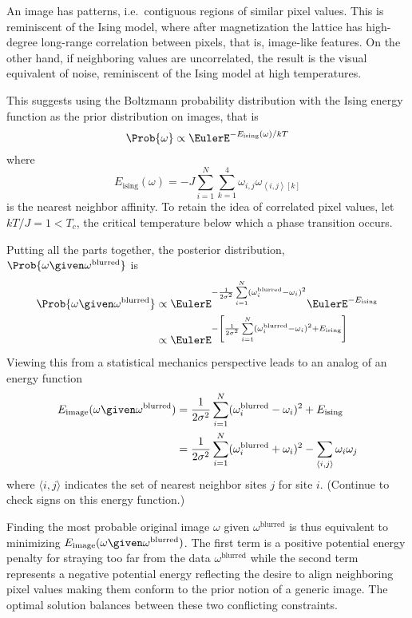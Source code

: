 \documentclass[12pt]{article}
\begin{document}
An image has patterns, i.e.\ contiguous regions of similar pixel values.
This is reminiscent of the Ising model, where after magnetization the
lattice has high-degree long-range correlation between pixels, that is,
image-like features.  On the other hand, if neighboring values are
uncorrelated, the result is the visual equivalent of noise, reminiscent
of the Ising model at high temperatures.

This suggests using the Boltzmann probability distribution with the
Ising energy function as the prior distribution on images, that is
\[
    \Prob{\omega} \propto \EulerE^{-E_{\text{ising}}(\omega)/kT}
\] where
\[
    E_{\text{ising}}(\omega) = -J \sum\limits_{i=1}^{N} \sum\limits_{k=1}^4
    \omega_{i, j} \omega_{\left\langle i,j \right\rangle[k]}
\] is the nearest neighbor affinity. To retain the idea of correlated
pixel values, let \( kT/J = 1 < T_c \), the critical temperature below
which a phase transition occurs.

Putting all the parts together, the posterior distribution, \( \Prob{\omega
\given \omega^{\text{blurred}}} \) is
\begin{align*}
    \Prob{\omega \given \omega^{\text{blurred}}} &\propto \EulerE^{-\frac
    {1}{2\sigma^2 } \sum\limits_{i=1}^N(\omega_i^{\text{blurred}} -
    \omega_i)^{2}} \EulerE^{-E_{\text{ising}}} \\
    &\propto \EulerE^{-\left[ \frac{1}{2\sigma^2 } \sum\limits_{i=1}^N(\omega_i^
    {\text{blurred}} - \omega_i)^{2} + E_{\text{ising}} \right] }
\end{align*}
Viewing this from a statistical mechanics perspective leads to an analog
of an energy function
\begin{align*}
    E_{\text{image}}(\omega \given \omega^{\text{blurred}}) &= \frac{1}{2\sigma^2
    } \sum\limits_{i=1}^N(\omega_i^{\text{blurred}} - \omega_i)^{2} + E_
    {\text{ising}} \\
    &= \frac{1}{2\sigma^2 } \sum\limits_{i=1}^N(\omega_i^{\text{blurred}}
    + \omega_i)^{2} - \sum\limits_{\langle i,j\rangle} \omega_i\omega_j
    \\
\end{align*}
where \( {\langle i,j\rangle} \) indicates the set of nearest neighbor
sites \( j \) for site \( i \).  (Continue to check signs on this energy
function.)

Finding the most probable original image \( \omega \) given \( \omega^{\text
{blurred}} \) is thus equivalent to minimizing \( E_{\text{image}}(\omega
\given \omega^{\text{blurred}}) \).  The first term is a positive
potential energy penalty for straying too far from the data \( \omega^{\text
{blurred}} \) while the second term represents a negative potential
energy reflecting the desire to align neighboring pixel values making
them conform to the prior notion of a generic image.  The optimal
solution balances between these two conflicting constraints.
\end{document}
